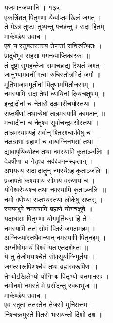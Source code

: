 \documentclass[11pt, openany]{book}
\begin{document}
{{{{{{{{{{{{{{{{{{{{{{{{{{{{{{{{{{{{{{{{{{{{{{{{{{{{{{{{{{{{ }{ यजमानजप्यानि । १३५}{\\
एकत्रिंशत् पितृगणा यैर्व्याप्तमखिलं जगत् ।\\
ते मेऽत्र तुष्टाः तुष्यन्तु यच्छन्तु व सदा हितम् \textbar{}\textbar{}\\
मार्कण्डेय उवाच ।\\
एवं च स्तुवतस्तस्य तेजसां राशिरुत्थितः ।\\
प्रादुर्बभूव सहसा गगनव्याप्तिकारकः ॥\\
तं दृष्ट्रा सुमहन्तेजः समाच्छाद्य स्थितं जगत् ।\\
जानुभ्यामवनीं गत्वा रुचिस्तोत्रमिदं जगौ ॥\\
मूर्तिभाजाममूर्तीनां पितॄणाममितौजसाम् ।\\
नमस्यामि सदा तेषां ध्यायिनां दिव्यचक्षुषाम् ॥\\
इन्द्रादीनां च नेतारो दक्षमारीचयोस्तथा ।\\
सप्तर्षीणां तथान्येषां तान्नमस्यामि कामदान् ॥\\
मन्वादीनां च नेतृश्व सूर्याचन्द्रमसोस्तथा ।\\
तान्नमस्याम्यहं सर्वान् पितरश्चार्णवेषु च \textbar{}\textbar{}\\
नक्षत्राणां ग्रहाणां च वाय्वग्निनभसां तथा ।\\
द्यावापृथिव्योश्च तथा नमस्यामि कृताञ्जलिः ॥\\
देवर्षीणां च नेतृश्व सर्वदेवनमस्कृतान् ।\\
अभयस्य सदा दातॄन् नमस्येऽह कृताञ्जलिः ॥\\
प्रजापतेः कश्यपाय सोमाय वरुणाय च ।\\
योगेश्वरेभ्यश्च तथा नमस्यामि कृताञ्जलिः ॥\\
नमो गणेभ्यः सप्तभ्यस्तथा लोकेषु सप्तसु ।\\
स्वयम्भुवे नमस्यामि ब्रह्मणे योगचक्षुषे ॥\\
यदाधाराः पितृगणा योगमूर्तिधरा हि ते ।\\
नमस्यामि ततः सोमं पितरं जगतामहम् ॥\\
अग्निरूपांस्तथैवान्यान् नमस्यापि पितृनहम् ।\\
अग्नीषोममयं विश्वं यत एतदशेषतः ॥\\
ये तु तेजोमयाश्चैते सोमसूर्याग्निमूर्तयः ।\\
जगत्स्वरूपिणश्चैव तथा ब्रह्मस्वरूपिणः ॥\\
तेभ्योऽखिलेभ्यो योगिभ्यः पितृभ्यो यतमानसः ।\\
नमोनमो नमस्ते मे प्रसीदन्तु स्वधाभुजः ॥\\
मार्कण्डेय उवाच ।\\
एव स्तुता ततस्तेन तेजसो मुनिसत्तम ।\\
निश्चक्रमुस्ते पितरो भासयन्तो दिशो दश ॥\\


}}}}}}}}}}}}}}}}}}}}}}}}}}}}}}}}}}}}}}}}}}}}}}}}}}}}}}}}}}}}
\end{document}
